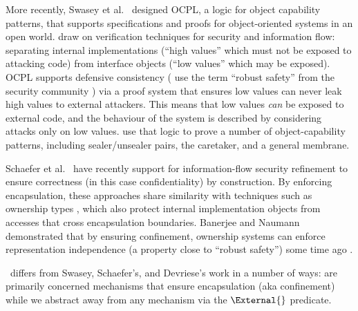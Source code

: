 More recently, Swasey et al.\ \cite{ddd}  designed OCPL, a logic
for object capability patterns, that supports specifications and
proofs for object-oriented systems in an open world.  
draw on verification techniques for security and
information flow: separating internal implementations (``high values''
which must not be exposed to attacking code) from interface objects
(``low values'' which may be exposed).  OCPL supports defensive
consistency %
( use the term ``robust safety'' from the
security community \cite{Bengtson}) via a proof system that ensures
low values can never leak high values to external attackers. 
This means that low values \textit{can} be exposed to external code,
and the behaviour of the system is described by considering attacks only
on low values.  %
 use that logic to
prove a number of object-capability patterns, including
sealer/unsealer pairs, the caretaker, and a general membrane.

Schaefer et al.\ \cite{schaeferCbC} have recently
  support for information-flow security %
 refinement to ensure correctness (in this case confidentiality) by
construction. 
By enforcing encapsulation,  %
these approaches share similarity with techniques such as
ownership types \cite{ownalias,NobPotVitECOOP98}, which also
protect internal implementation objects from accesses that cross
encapsulation boundaries.  Banerjee and Naumann demonstrated that by
ensuring confinement, ownership
systems can enforce representation independence (a property close to
``robust safety'') some time ago \cite{Banerjee:2005}.

 
\Chainmail\ differs from Swasey, Schaefer's, and Devriese's work in a number of ways:
 are primarily concerned  %
mechanisms that ensure encapsulation (aka 
confinement) while we abstract away from any mechanism via the
$\External{}$ predicate. 

